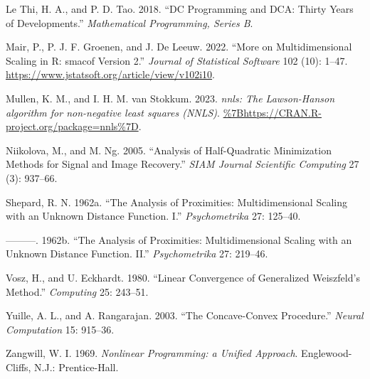 \documentclass[
  12pt,
]{article}
\newlength{\cslhangindent}
\newenvironment{CSLReferences}[2] %
 {\begin{list}{}{%
  \setlength{\itemindent}{0pt}
  \setlength{\leftmargin}{0pt}
  \setlength{\parsep}{0pt}
  \ifodd #1
   \setlength{\leftmargin}{\cslhangindent}
   \setlength{\itemindent}{-1\cslhangindent}
  \fi
  \setlength{\itemsep}{#2\baselineskip}}}
 {\end{list}}
\begin{document}
\begin{CSLReferences}{1}{0}
Le Thi, H. A., and P. D. Tao. 2018. {``{DC Programming and DCA: Thirty Years of Developments}.''} \emph{Mathematical Programming, Series B}.

Mair, P., P. J. F. Groenen, and J. De Leeuw. 2022. {``{More on Multidimensional Scaling in R: smacof Version 2}.''} \emph{Journal of Statistical Software} 102 (10): 1--47. \url{https://www.jstatsoft.org/article/view/v102i10}.

Mullen, K. M., and I. H. M. van Stokkum. 2023. \emph{{nnls: The Lawson-Hanson algorithm for non-negative least squares (NNLS)}}. \url{\%7Bhttps://CRAN.R-project.org/package=nnls\%7D}.

Niikolova, M., and M. Ng. 2005. {``Analysis of Half-Quadratic Minimization Methods for Signal and Image Recovery.''} \emph{SIAM Journal Scientific Computing} 27 (3): 937--66.

Shepard, R. N. 1962a. {``{The Analysis of Proximities: Multidimensional Scaling with an Unknown Distance Function. I}.''} \emph{Psychometrika} 27: 125--40.

---------. 1962b. {``{The Analysis of Proximities: Multidimensional Scaling with an Unknown Distance Function. II}.''} \emph{Psychometrika} 27: 219--46.

Vosz, H., and U. Eckhardt. 1980. {``{Linear Convergence of Generalized {W}eiszfeld's Method}.''} \emph{Computing} 25: 243--51.

Yuille, A. L., and A. Rangarajan. 2003. {``{The Concave-Convex Procedure}.''} \emph{Neural Computation} 15: 915--36.

Zangwill, W. I. 1969. \emph{{Nonlinear Programming: a Unified Approach}}. Englewood-Cliffs, N.J.: Prentice-Hall.

\end{CSLReferences}
\end{document}
